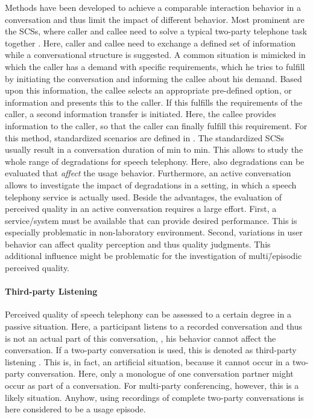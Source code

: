 Methods have been developed to achieve a comparable interaction behavior in a conversation and thus limit the impact of different behavior.
Most prominent are the \acp{SCS}, where caller and callee need to solve a typical two-party telephone task together \citep[][p.~76]{moller_assessment_2000}.
Here, caller and callee need to exchange a defined set of information while a conversational structure is suggested.
A common situation is mimicked in which the caller has a demand with specific requirements, which he tries to fulfill by initiating the conversation and informing the callee about his demand.
Based upon this information, the callee selects an appropriate pre-defined option, or information and presents this to the caller.
If this fulfills the requirements of the caller, a second information transfer is initiated.
Here, the callee provides information to the caller, so that the caller can finally fulfill this requirement.
For this method, standardized scenarios are defined in \citet{itu-t_recommendation_p.805_subjective_2007}.
The standardized \acp{SCS} usually result in a conversation duration of \unit[3]{min} to \unit[7]{min}.
This allows to study the whole range of degradations for speech telephony.
Here, also degradations can be evaluated that \emph{affect} the usage behavior. %
Furthermore, an active conversation allows to investigate the impact of degradations in a setting, in which a speech telephony service is actually used.
Beside the advantages, the evaluation of perceived quality in an active conversation requires a large effort.
First, a service/system must be available that can provide desired performance.
This is especially problematic in non-laboratory environment.
Second, variations in user behavior can affect quality perception and thus quality judgments.
This additional influence might be problematic for the investigation of multi\=/episodic perceived quality.

\paragraph*{Third-party Listening}
Perceived quality of speech telephony can be assessed  to a certain degree in a passive situation.
Here, a participant listens to a recorded conversation and thus is not an actual part of this conversation, \ie, his behavior cannot affect the conversation.
If a two-party conversation is used, this is denoted as third-party listening \citep[][p.~13]{itu-t_recommendation_p.832_subjective_2000}.
This is, in fact, an artificial situation, because it cannot occur in a two-party conversation.
Here, only a monologue of one conversation partner might occur as part of a conversation.
For multi-party conferencing, however, this is a likely situation.
Anyhow, using recordings of complete two-party conversations is here considered to be a usage episode.

